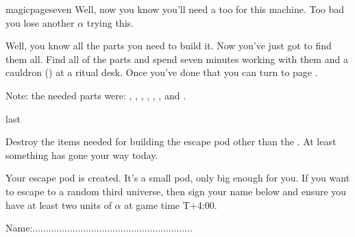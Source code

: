 \documentclass[greennotebook]{guildcamp3} %
\begin{document}
\begin{page}{magicpageseven}
	Well, now you know you'll need a \iUnicornHoof{} too for this machine. Too bad you lose another $\alpha$ trying this. 	
	
	Well, you know all the parts you need to build it. Now you've just got to find them all. Find all of the parts and spend seven minutes working with them and a cauldron (\iCauldron{}) at a ritual desk. Once you've done that you can turn to page . 
	
	Note: the needed parts were: \iUnicornHoof{}, \iDragonSkin{}, \iBelladonna{}, \iHolyWater{}, \iWerewolfFang{}, \iStardust{}, and \iScrapMetal{}. 
\end{page}

\begin{page}{last}

Destroy the items needed for building the escape pod other than the \iCauldron{}. At least something has gone your way today. 

Your escape pod is created. It's a small pod, only big enough for you. If you want to escape to a random third universe, then sign your name below and ensure you have at least two units of $\alpha$ at game time T+4:00. 

Name:............................................................

\end{page}



\endnotebook
\end{document}
